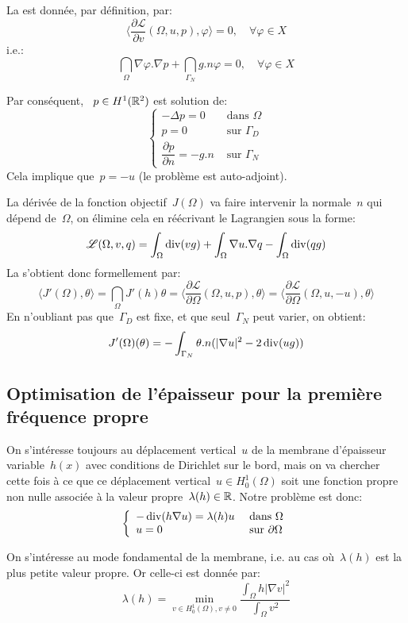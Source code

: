 \medskip
La  est donnée, par définition, par:
\[ \langle \dfrac{\partial \mathscr{L}}{\partial v}(\Omega,u,p),\varphi\rangle=0, \quad \forall\varphi\in X \]
i.e.:
\[ \dint_\Omega \nabla\varphi.\nabla p + \dint_{\Gamma_N} g.n\varphi =0, \quad \forall\varphi\in X \]

Par conséquent, ~$p\in H^1(\mathbb R^2)$ est solution de:
\[\left\{\begin{array}{ll}
-\Delta p =0 &\text{ dans }\Omega\\
p=0 &\text{ sur }\Gamma_D\\
\dfrac{\partial p}{\partial n}=-g.n &\text{ sur }\Gamma_N
\end{array}\right.\]
Cela implique que~$p=-u$ (le problème est auto-adjoint).

\medskip
La dérivée de la fonction objectif~$J(\Omega)$ va faire intervenir la normale~$n$ qui dépend de~$\Omega$, on élimine cela en réécrivant le Lagrangien sous la forme:
\[ \mathscr{L}(\Omega,v,q)=\displaystyle\int_\Omega \operatorname{div}(vg) + \displaystyle\int_\Omega\nabla u.\nabla q-\displaystyle\int_\Omega \operatorname{div}(qg) \]
La  s'obtient donc formellement par:
\[ \langle J'(\Omega),\theta\rangle = \dint_\Omega J'(h)\theta = \langle\dfrac{\partial\mathscr{L}}{\partial \Omega}(\Omega,u,p),\theta\rangle = \langle\dfrac{\partial\mathscr{L}}{\partial \Omega}(\Omega,u,-u),\theta\rangle  \]
En n'oubliant pas que~$\Gamma_D$ est fixe, et que seul~$\Gamma_N$ peut varier, on obtient:
\[ J'(\Omega)(\theta)= -\displaystyle\int_{\Gamma_N} \theta.n(|\nabla u|^2-2\operatorname{div}(ug)) \]


\medskip
\subsection{Optimisation de l'épaisseur pour la première fréquence propre}

On s'intéresse toujours au déplacement vertical~$u$ de la membrane d'épaisseur variable~$h(x)$ avec conditions de Dirichlet sur le bord, mais on va chercher cette fois à ce que ce déplacement vertical~$u\in H^1_0(\Omega)$ soit une fonction propre non nulle associée à la valeur propre~$\lambda(h)\in\mathbb R$. Notre problème est donc:
\[\left\{\begin{array}{ll} -\operatorname{div} (h\nabla u)=\lambda(h)u &\text{ dans }\Omega\\ u=0 &\text{ sur }\partial\Omega \end{array} \right. \]

On s'intéresse au mode fondamental de la membrane, i.e. au cas où~$\lambda(h)$ est la plus petite valeur propre. Or celle-ci est donnée par:
\[ \lambda(h) = \min_{v\in H^1_0(\Omega), v\ne 0} \dfrac{\int_\Omega h|\nabla v|^2}{\int_\Omega v^2} \]

